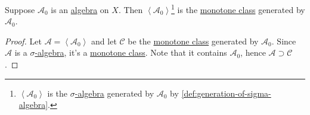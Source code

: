 \begin{theorem}\label{thm:monotone-class-lemma}
	Suppose \(\mathcal{A} _0\) is an \hyperref[def:algebra]{algebra} on \(X\). Then \(\left< \mathcal{A} _0 \right>\)\footnote{\(\left< \mathcal{A} _0 \right> \) is
		the \hyperref[def:sigma-algebra]{\(\sigma\)-algebra} generated by \(\mathcal{A} _0\) by \autoref{def:generation-of-sigma-algebra}.}
	is the \hyperref[def:monotone-class]{monotone class} generated by \(\mathcal{A} _0\).
\end{theorem}
\begin{proof}
	Let \(\mathcal{A}  = \left< \mathcal{A} _0 \right> \) and let \(\mathcal{C} \) be the \hyperref[def:monotone-class]{monotone class}
	generated by \(\mathcal{A} _0\). Since \(\mathcal{A} \) is a \hyperref[def:sigma-algebra]{\(\sigma\)-algebra}, it's a
	\hyperref[def:monotone-class]{monotone class}. Note that it contains \(\mathcal{A} _0\), hence \(\mathcal{A} \supset \mathcal{C} \).


\end{proof}
